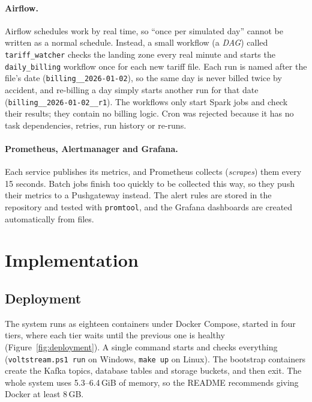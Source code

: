 \documentclass[11pt,a4paper]{article}
\begin{document}
\paragraph{Airflow.} Airflow \cite{airflow} schedules work by real time, so ``once per
simulated day'' cannot be written as a normal schedule. Instead, a small workflow (a
\emph{DAG}) called \texttt{tariff\_watcher} checks the landing zone every real minute and
starts the \texttt{daily\_billing} workflow once for each new tariff file. Each run is named
after the file's date (\texttt{billing\_\_2026-01-02}), so the same day is never billed twice
by accident, and re-billing a day simply starts another run for that date
(\texttt{billing\_\_2026-01-02\_\_r1}). The workflows only start Spark jobs and check their
results; they contain no billing logic. Cron was rejected because it has no task
dependencies, retries, run history or re-runs.

\paragraph{Prometheus, Alertmanager and Grafana.} Each service publishes its metrics, and
Prometheus \cite{prometheus} collects (\emph{scrapes}) them every 15 seconds. Batch jobs
finish too quickly to be collected this way, so they push their metrics to a Pushgateway
instead. The alert rules are stored in the repository and tested with \texttt{promtool}, and
the Grafana dashboards are created automatically from files.

\section{Implementation}
\label{sec:implementation}

\subsection{Deployment}

The system runs as eighteen containers under Docker Compose, started in four tiers, where
each tier waits until the previous one is healthy (Figure~\ref{fig:deployment}). A single
command starts and checks everything (\texttt{voltstream.ps1 run} on Windows,
\texttt{make up} on Linux). The bootstrap containers create the Kafka topics, database
tables and storage buckets, and then exit. The whole system uses 5.3--6.4\,GiB of memory, so
the README recommends giving Docker at least 8\,GB.
\end{document}
